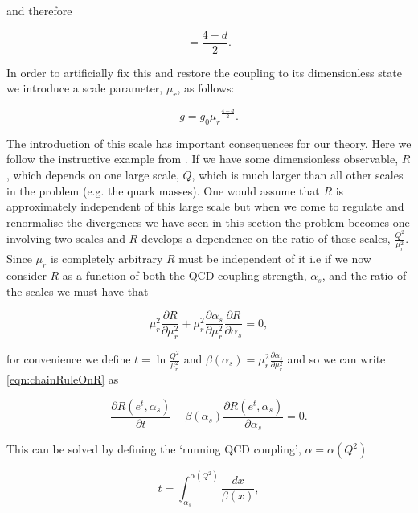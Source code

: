 		and therefore

		\begin{equation}
			[g] = \frac{4-d}{2}.
		\end{equation}

		In order to artificially fix this and restore the coupling to its dimensionless state we
		introduce a scale parameter, $\mu_r$, as follows:

		\begin{equation}
			g = g_0{\mu_r}^{\frac{4-d}{2}}.
		\end{equation}

		The introduction of this scale has important consequences for our theory.  Here we follow the instructive example
		from \cite{pinkBook}.  If we have some dimensionless observable, $R$, which depends on one large scale, $Q$, which
		is much larger than all other scales in the problem (e.g. the quark masses).  One would assume that $R$ is
		approximately independent of this large scale but when we come to regulate and renormalise the divergences we have
		seen in this section the problem becomes one involving two scales and $R$ develops a dependence on the ratio of
		these scales, $\frac{Q^2}{\mu_r^2}$.  Since $\mu_r$ is completely arbitrary $R$ must be independent of it i.e if we
		now consider $R$ as a function of both the QCD coupling strength, $\alpha_s$, and the ratio of the scales we must
		have that

		\begin{equation}
			\mu_r^2\frac{\partial R}{\partial\mu_r^2} + \mu_r^2\frac{\partial \alpha_s}{\partial \mu_r^2}\frac{\partial R}{\partial\alpha_s} = 0,
			\label{eqn:chainRuleOnR}
		\end{equation}

		for convenience we define $t = \ln\frac{Q^2}{\mu_r^2}$ and $\beta(\alpha_s) = \mu_r^2\frac{\partial \alpha_s}{\partial \mu_r^2}$
		and so we can write \ref{eqn:chainRuleOnR} as

		\begin{equation}
			\frac{\partial R(e^t, \alpha_s)}{\partial t} - \beta(\alpha_s)\frac{\partial R(e^t, \alpha_s)}{\partial \alpha_s} = 0.
		\end{equation}

		This can be solved by defining the `running QCD coupling', $\alpha=\alpha(Q^2)$

		\begin{equation}
			t = \int_{\alpha_s}^{\alpha(Q^2)}\frac{dx}{\beta(x)},
			\label{eqn:solvingRunning}
		\end{equation}

